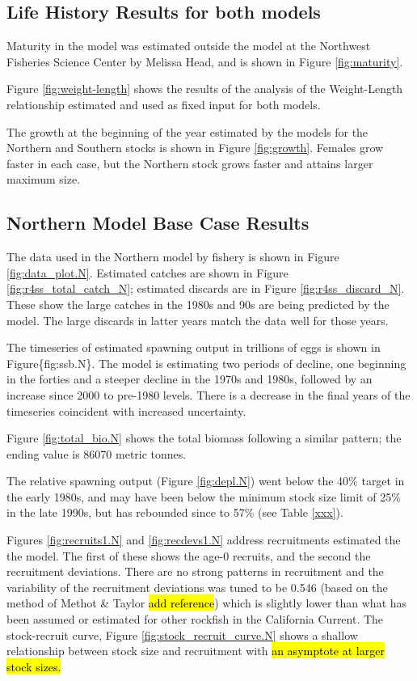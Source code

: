 \documentclass[12pt,]{article}
\begin{document}
\clearpage

\subsection{Life History Results for both
models}\label{life-history-results-for-both-models}

Maturity in the model was estimated outside the model at the Northwest
Fisheries Science Center by Melissa Head, and is shown in Figure
\ref{fig:maturity}.

Figure \ref{fig:weight-length} shows the results of the analysis of the
Weight-Length relationship estimated and used as fixed input for both
models.

The growth at the beginning of the year estimated by the models for the
Northern and Southern stocks is shown in Figure \ref{fig:growth}.
Females grow faster in each case, but the Northern stock grows faster
and attains larger maximum size.

\subsection{Northern Model Base Case
Results}\label{northern-model-base-case-results}

The data used in the Northern model by fishery is shown in Figure
\ref{fig:data_plot.N}. Estimated catches are shown in Figure
\ref{fig:r4ss_total_catch_N}; estimated discards are in Figure
\ref{fig:r4ss_discard_N}. These show the large catches in the 1980s and
90s are being predicted by the model. The large discards in latter years
match the data well for those years.

The timeseries of estimated spawning output in trillions of eggs is
shown in Figure\{fig:ssb.N\}. The model is estimating two periods of
decline, one beginning in the forties and a steeper decline in the 1970s
and 1980s, followed by an increase since 2000 to pre-1980 levels. There
is a decrease in the final years of the timeseries coincident with
increased uncertainty.

Figure \ref{fig:total_bio.N} shows the total biomass following a similar
pattern; the ending value is 86070 metric tonnes.

The relative spawning output (Figure \ref{fig:depl.N}) went below the
40\% target in the early 1980s, and may have been below the minimum
stock size limit of 25\% in the late 1990s, but has rebounded since to
57\% (see Table \ref{xxx}).

Figures \ref{fig:recruits1.N} and \ref{fig:recdevs1.N} address
recruitments estimated the the model. The first of these shows the age-0
recruits, and the second the recruitment deviations. There are no strong
patterns in recruitment and the variability of the recruitment
deviations was tuned to be 0.546 (based on the method of Methot \&
Taylor \hl{add reference}) which is slightly lower than what has been
assumed or estimated for other rockfish in the California Current. The
stock-recruit curve, Figure \ref{fig:stock_recruit_curve.N} shows a
shallow relationship between stock size and recruitment with
\hl{an asymptote at larger stock sizes.}
\end{document}
